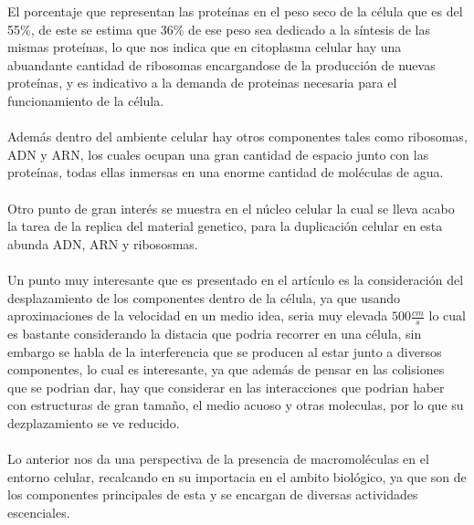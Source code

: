 \documentclass[10pt]{article}
\newcommand{\np}[1]{\paragraph{\normalfont{#1}}}
\begin{document}
    El porcentaje que representan las proteínas en el peso seco de la célula que es del 55\%, de este se estima que 36\% de ese peso sea dedicado a la síntesis de las mismas proteínas, lo que nos indica que en citoplasma celular hay una abuandante cantidad de ribosomas encargandose de la producción de nuevas proteínas, y es indicativo a la demanda de proteinas necesaria para el funcionamiento de la célula.\np{}

    Además dentro del ambiente celular hay otros componentes tales como ribosomas, ADN y ARN, los cuales ocupan una gran cantidad de espacio junto con las proteínas, todas ellas inmersas en una enorme cantidad de moléculas de agua.\np{}

    Otro punto de gran interés se muestra en el núcleo celular la cual se lleva acabo la tarea de la replica del material genetico, para la duplicación celular en esta abunda ADN, ARN y ribososmas.\np{}

    Un punto muy interesante que es presentado en el artículo es la consideración del desplazamiento de los componentes dentro de la célula, ya que usando aproximaciones de la velocidad en un medio idea, seria muy elevada $500\frac{cm}{s}$ lo cual es bastante considerando la distacia que podria recorrer en una célula, sin embargo se habla de la interferencia que se producen al estar junto a diversos componentes, lo cual es interesante, ya que además de pensar en las colisiones que se podrian dar, hay que considerar en las interacciones que podrian haber con estructuras de gran tamaño, el medio acuoso y otras moleculas, por lo que su dezplazamiento se ve reducido.\np{}

    Lo anterior nos da una perspectiva de la presencia de macromoléculas en el entorno celular, recalcando en su importacia en el ambito biológico, ya que son de los componentes principales de esta y se encargan de diversas actividades escenciales.


    
    

\end{document}

